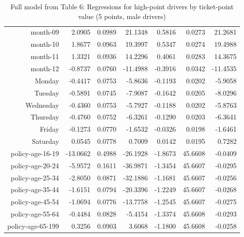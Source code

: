 \documentclass[10pt]{article}
\begin{document}
\begin{table}[ht]
\begin{tabular}{rrrrrrr}
  month-09 & 2.0905 & 0.0989 & 21.1348 & 0.5816 & 0.0273 & 21.2681 \\ 
  month-10 & 1.8677 & 0.0963 & 19.3997 & 0.5347 & 0.0274 & 19.4988 \\ 
  month-11 & 1.3321 & 0.0936 & 14.2296 & 0.4061 & 0.0283 & 14.3675 \\ 
  month-12 & -0.8737 & 0.0760 & -11.4988 & -0.3916 & 0.0342 & -11.4535 \\ 
  Monday & -0.4417 & 0.0753 & -5.8636 & -0.1193 & 0.0202 & -5.9058 \\ 
  Tuesday & -0.5891 & 0.0745 & -7.9087 & -0.1642 & 0.0205 & -8.0296 \\ 
  Wednesday & -0.4360 & 0.0753 & -5.7927 & -0.1188 & 0.0202 & -5.8763 \\ 
  Thursday & -0.4760 & 0.0752 & -6.3261 & -0.1290 & 0.0203 & -6.3641 \\ 
  Friday & -0.1273 & 0.0770 & -1.6532 & -0.0326 & 0.0198 & -1.6461 \\ 
  Saturday & 0.0545 & 0.0778 & 0.7009 & 0.0142 & 0.0195 & 0.7282 \\ 
  policy-age-16-19 & -13.0662 & 0.4988 & -26.1928 & -1.8673 & 45.6608 & -0.0409 \\ 
  policy-age-20-24 & -5.9572 & 0.1611 & -36.9871 & -1.3454 & 45.6607 & -0.0295 \\ 
  policy-age-25-34 & -2.8050 & 0.0871 & -32.1886 & -1.1681 & 45.6607 & -0.0256 \\ 
  policy-age-35-44 & -1.6151 & 0.0794 & -20.3396 & -1.2249 & 45.6607 & -0.0268 \\ 
  policy-age-45-54 & -1.0694 & 0.0776 & -13.7758 & -1.2545 & 45.6607 & -0.0275 \\ 
  policy-age-55-64 & -0.4484 & 0.0828 & -5.4154 & -1.3374 & 45.6608 & -0.0293 \\ 
  policy-age-65-199 & 0.3256 & 0.0903 & 3.6068 & -1.1800 & 45.6608 & -0.0258 \\ 
   \hline
\end{tabular}
\caption{Full model from Table 6: Regressions for high-point drivers by ticket-point value (5 points, male drivers)} 
\label{tab_6_5_pts_M}
\end{table}


\clearpage
\pagebreak



\end{document}

